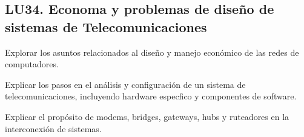 \subsection{LU34. Econom­a y problemas de diseño de sistemas de Telecomunicaciones}\label{sec:LU34}
\begin{LearningUnit}
\begin{LUGoal}
\item Explorar los asuntos relacionados al diseño y manejo económico de las redes de computadores.
\end{LUGoal}

\begin{LUObjective}
\item Explicar los pasos en el análisis y configuración de un sistema de telecomunicaciones, incluyendo hardware espec­fico y componentes de software.
\item Explicar el propósito de modems, bridges, gateways, hubs y ruteadores en la interconexión de sistemas.
\end{LUObjective}
\end{LearningUnit}


